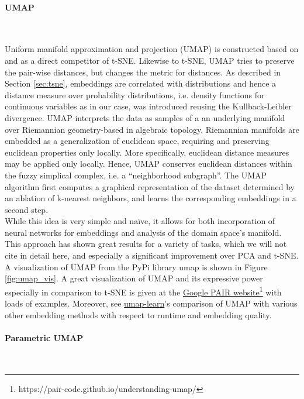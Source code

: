 \documentclass[]{article}
\renewcommand{\cite}{\citep}
\begin{document}
\paragraph{UMAP}\mbox{}\\
\label{sec:umap}

Uniform manifold approximation and projection (UMAP) \cite{mcinnes2018umap} is constructed based on and as a direct competitor of t-SNE. Likewise to t-SNE, UMAP tries to preserve the pair-wise distances, but changes the metric for distances. As described in Section \ref{sec:tsne}, embeddings are correlated with distributions and hence a distance measure over probability distributions, i.e. density functions for continuous variables as in our case, was introduced reusing the Kullback-Leibler divergence. UMAP interprets the data as samples of a an underlying manifold over Riemannian geometry-based in algebraic topology. Riemannian manifolds are embedded as a generalization of euclidean space, requiring and preserving euclidean properties only locally. More specifically, euclidean distance measures may be applied only locally. Hence, UMAP conserves euclidean distances within the fuzzy simplical complex, i.e. a ``neighborhood subgraph''.
The UMAP algorithm first computes a graphical representation of the dataset determined by an ablation of k-nearest neighbors, and learns the corresponding embeddings in a second step. \\

While this idea is very simple and na\"ive, it allows for both incorporation of neural networks for embeddings and analysis of the domain space's manifold. This approach has shown great results for a variety of tasks, which we will not cite in detail here, and especially a significant improvement over PCA and t-SNE.
A visualization of UMAP from the PyPi library umap is shown in Figure \ref{fig:umap_vis}.
A great visualization of UMAP and its expressive power especially in comparison to t-SNE is given at the \href{https://pair-code.github.io/understanding-umap/}{Google PAIR website}\footnote{https://pair-code.github.io/understanding-umap/} with loads of examples. Moreover, see \href{https://umap-learn.readthedocs.io/en/latest/performance.html}{umap-learn}'s comparison of UMAP with various other embedding methods with respect to runtime and embedding quality.

\paragraph{Parametric UMAP}\mbox{}\\
\label{sec:paraumap}
\end{document}
